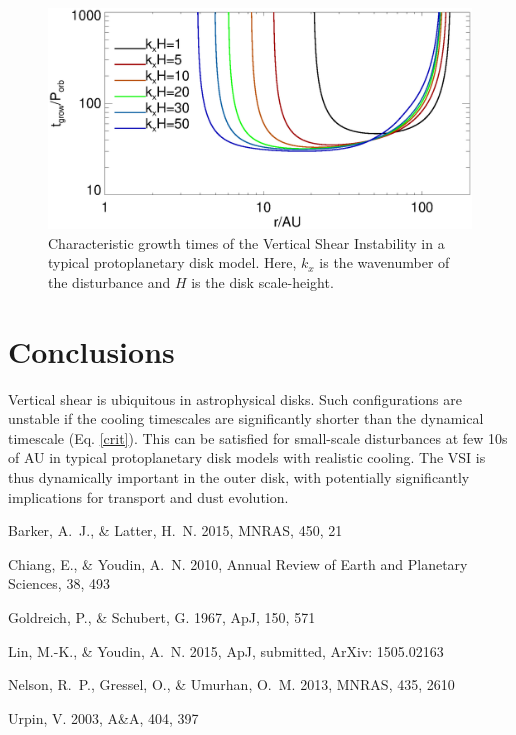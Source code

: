 \documentclass{iau}
\newcommand{\apj}{ApJ}
\newcommand{\mnras}{MNRAS}
\newcommand{\aap}{A\&A}
\begin{document}
\begin{figure}
  \begin{center}
    \includegraphics[width=\linewidth]{eigen_compare_grow.ps} 
    \caption{Characteristic growth times of the Vertical Shear
      Instability in a typical protoplanetary disk model. Here, $k_x$
      is the wavenumber of the disturbance and $H$ is the disk
      scale-height. 
      \label{mmsn}}
  \end{center}
\end{figure}

\section{Conclusions}
Vertical shear is ubiquitous in astrophysical disks. Such
configurations are unstable if the cooling timescales are
significantly shorter than the dynamical timescale (Eq. \ref{crit}). 
This can be satisfied for small-scale disturbances at few 10s
of AU in typical protoplanetary disk 
models with realistic cooling. The VSI is thus dynamically important
in the outer disk, with potentially significantly implications for
transport and dust evolution. 





\begin{thebibliography}{}
  
  {Barker}, A.~J., \& {Latter}, H.~N. 2015, \mnras, 450, 21 
  
  {Chiang}, E., \& {Youdin}, A.~N. 2010, Annual Review of Earth and Planetary
  Sciences, 38, 493
  
  {Goldreich}, P., \& {Schubert}, G. 1967, \apj, 150, 571
  
  {Lin}, M.-K., \& {Youdin}, A.~N. 2015, \apj, submitted, ArXiv: 1505.02163
  
  {Nelson}, R.~P., {Gressel}, O., \& {Umurhan}, O.~M. 2013, \mnras, 435, 2610
  
  {Urpin}, V. 2003, \aap, 404, 397
\end{thebibliography}

% 
% 
\end{document}

